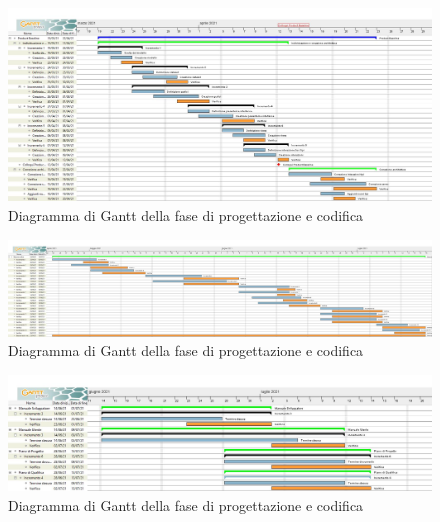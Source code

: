 \documentclass[../piano_di_progetto.tex]{subfiles}
\begin{document}
\begin{landscape}
    \begin{figure}
    \centering
    \includegraphics[width=1\textwidth, width=200mm, angle=90]{src/img/gantt/redazione_architettura_RQ.jpg}
    \caption{Diagramma di Gantt della fase di progettazione e codifica}
    \end{figure}
\end{landscape}

\begin{landscape}
    \begin{figure}
    \centering
    \includegraphics[width=1\textwidth, width=200mm, angle=90]{src/img/gantt/stesura_codiceRQ.jpg}
    \caption{Diagramma di Gantt della fase di progettazione e codifica}
    \end{figure}
\end{landscape}

\begin{landscape}
    \begin{figure}
    \centering
    \includegraphics[width=1\textwidth, width=200mm, angle=90]{src/img/gantt/documenti_RQ_parte2.jpg}
    \caption{Diagramma di Gantt della fase di progettazione e codifica}
    \end{figure}
\end{landscape}
\end{document}
